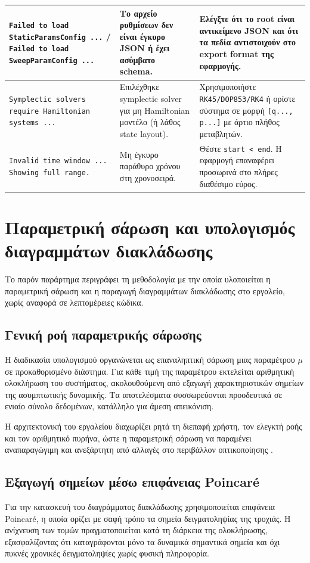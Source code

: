 \documentclass[11pt,a4paper]{report}
\begin{document}
\begin{table}[H]
\begin{tabular}{|p{}|p{}|p{}|}
\hline
\texttt{Failed to load StaticParamsConfig ...} / \texttt{Failed to load SweepParamConfig ...} &
Το αρχείο ρυθμίσεων δεν είναι έγκυρο JSON ή έχει ασύμβατο schema. &
Ελέγξτε ότι το root είναι αντικείμενο JSON και ότι τα πεδία αντιστοιχούν στο export format της εφαρμογής. \\
\hline
\texttt{Symplectic solvers require Hamiltonian systems ...} &
Επιλέχθηκε symplectic solver για μη Hamiltonian μοντέλο (ή λάθος state layout). &
Χρησιμοποιήστε \texttt{RK45/DOP853/RK4} ή ορίστε σύστημα σε μορφή \texttt{[q..., p...]} με άρτιο πλήθος μεταβλητών. \\
\hline
\texttt{Invalid time window ... Showing full range.} &
Μη έγκυρο παράθυρο χρόνου στη χρονοσειρά. &
Θέστε \texttt{start < end}. Η εφαρμογή επαναφέρει προσωρινά στο πλήρες διαθέσιμο εύρος. \\
\hline
\end{tabular}
\end{table}

\section{Παραμετρική σάρωση και υπολογισμός
διαγραμμάτων διακλάδωσης}
\label{app:sweep}

Το παρόν παράρτημα περιγράφει τη μεθοδολογία με την οποία υλοποιείται η
παραμετρική σάρωση και η παραγωγή διαγραμμάτων διακλάδωσης στο εργαλείο,
χωρίς αναφορά σε λεπτομέρειες κώδικα.

\subsection{Γενική ροή παραμετρικής σάρωσης}
Η διαδικασία υπολογισμού οργανώνεται ως επαναληπτική σάρωση μιας
παραμέτρου $\mu$ σε προκαθορισμένο διάστημα. Για κάθε τιμή της
παραμέτρου εκτελείται αριθμητική ολοκλήρωση του συστήματος, ακολουθούμενη
από εξαγωγή χαρακτηριστικών σημείων της ασυμπτωτικής δυναμικής. Τα
αποτελέσματα συσσωρεύονται προοδευτικά σε ενιαίο σύνολο δεδομένων,
κατάλληλο για άμεση απεικόνιση.

Η αρχιτεκτονική του εργαλείου διαχωρίζει ρητά τη διεπαφή χρήστη, τον
ελεγκτή ροής και τον αριθμητικό πυρήνα, ώστε η παραμετρική σάρωση να
παραμένει αναπαραγώγιμη και ανεξάρτητη από αλλαγές στο περιβάλλον
οπτικοποίησης \cite{nlds_internal_md_docs}.

\subsection{Εξαγωγή σημείων μέσω επιφάνειας Poincaré}
Για την κατασκευή του διαγράμματος διακλάδωσης χρησιμοποιείται επιφάνεια
Poincaré, η οποία ορίζει με σαφή τρόπο τα σημεία δειγματοληψίας της
τροχιάς. Η ανίχνευση των τομών πραγματοποιείται κατά τη διάρκεια της
ολοκλήρωσης, εξασφαλίζοντας ότι καταγράφονται μόνο τα δυναμικά
σημαντικά σημεία και όχι πυκνές χρονικές δειγματοληψίες χωρίς φυσική
πληροφορία.
\end{document}
